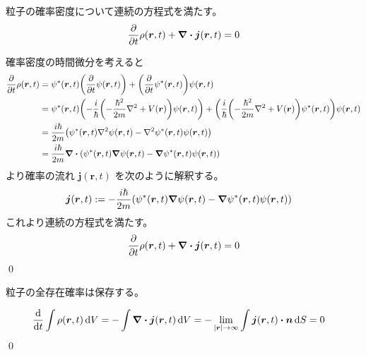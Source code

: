 \documentclass[uplatex,dvipdfmx,a4paper,11pt]{jlreq}
\makeatletter
\newcommand{\rr}{\bm{r}}
\theoremstyle{definition}
\renewenvironment{proof}[1][\proofname]{\par
  \normalfont
  \topsep6\p@\@plus6\p@ \trivlist
  \item[\hskip\labelsep{\bfseries #1}\@addpunct{\bfseries}]\ignorespaces\quad\par
}{%
  \qed\endtrivlist\@endpefalse
}
\renewcommand\proofname{証明}
\makeatother
\begin{document}
\begin{theorem}
  粒子の確率密度について連続の方程式を満たす。
  \begin{align}
    \pdv{t}\rho(\rr, t) + \vnabla\vdot\bm{j}(\rr, t) = 0
  \end{align}
\end{theorem}
\begin{proof}
  確率密度の時間微分を考えると
  \begin{align}
    \pdv{t}\rho(\rr, t) & = \psi^*(\rr, t)\qty(\pdv{t}\psi(\rr, t)) + \qty(\pdv{t}\psi^*(\rr, t))\psi(\rr, t)                                                                                                      \\
                        & = \psi^*(\rr, t)\qty(-\frac{i}{\hbar}\qty(-\frac{\hbar^2}{2m}\nabla^2 + V(\rr))\psi(\rr, t)) + \qty(\frac{i}{\hbar}\qty(-\frac{\hbar^2}{2m}\nabla^2 + V(\rr))\psi^*(\rr, t))\psi(\rr, t) \\
                        & = \frac{i\hbar}{2m}\qty(\psi^*(\rr, t)\nabla^2\psi(\rr, t) - \nabla^2\psi^*(\rr, t)\psi(\rr, t))                                                                                         \\
                        & = \frac{i\hbar}{2m}\vnabla\vdot\qty(\psi^*(\rr, t)\vnabla\psi(\rr, t) - \vnabla\psi^*(\rr, t)\psi(\rr, t))
  \end{align}
  より確率の流れ $\bm{j}(\rr, t)$ を次のように解釈する。
  \begin{align}
    \bm{j}(\rr, t) & := -\frac{i\hbar}{2m}\qty(\psi^*(\rr, t)\vnabla\psi(\rr, t) - \vnabla\psi^*(\rr, t)\psi(\rr, t))
  \end{align}
  これより連続の方程式を満たす。
  \begin{align}
    \pdv{t}\rho(\rr, t) + \vnabla\vdot\bm{j}(\rr, t) = 0
  \end{align}
\end{proof}

\begin{theorem}
  粒子の全存在確率は保存する。
\end{theorem}
\begin{proof}
  \begin{align}
    \dv{t}\int\rho(\rr, t)\dd{V} & = -\int\vnabla\vdot\bm{j}(\rr, t)\dd{V} = -\lim_{|\rr|\to\infty}\int\bm{j}(\rr, t)\vdot\bm{n}\dd{S} = 0
  \end{align}
\end{proof}
\end{document}
